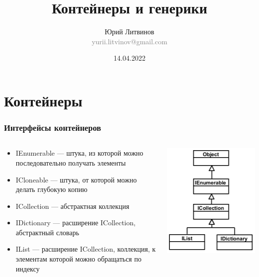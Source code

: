 \documentclass[xetex,mathserif,serif]{beamer}
\title{Контейнеры и генерики}
\author[Юрий Литвинов]{Юрий Литвинов\\\small{\textcolor{gray}{yurii.litvinov@gmail.com}}}
\date{14.04.2022}
\begin{document}
    \frame{\titlepage}

    \section{Контейнеры}

    \begin{frame}
        \frametitle{Интерфейсы контейнеров}
        \begin{columns}
            \begin{column}{0.65\textwidth}
                \begin{itemize}
                    \item IEnumerable --- штука, из которой можно последовательно получать элементы
                    \item ICloneable --- штука, от которой можно делать глубокую копию
                    \item ICollection --- абстрактная коллекция
                    \item IDictionary --- расширение ICollection, абстрактный словарь
                    \item IList --- расширение ICollection, коллекция, к элементам которой можно обращаться по индексу
                \end{itemize}
            \end{column}
            \begin{column}{0.3\textwidth}
                \includegraphics[width=\textwidth]{interfaces.png}
            \end{column}
        \end{columns}
    \end{frame}
\end{document}

